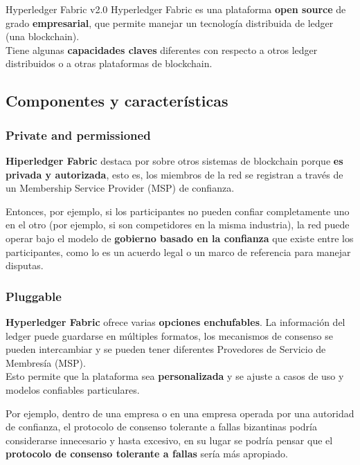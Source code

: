 \documentclass{beamer}
\begin{document}
	\begin{frame}
		\begin{block}{Hyperledger Fabric v2.0}
			Hyperledger Fabric es una plataforma \textbf{open source} de grado \textbf{empresarial}, que permite manejar un tecnología distribuida de ledger (una blockchain).\\
			\vspace{4mm}
			Tiene algunas \textbf{capacidades claves} diferentes con respecto a otros ledger distribuidos o a otras plataformas de blockchain.
		\end{block}
	\end{frame}

	\subsection{Componentes y características}
	
	\begin{frame}
		\frametitle{Private and permissioned}
		\textbf{Hiperledger Fabric} destaca por sobre otros sistemas de blockchain porque \textbf{es privada y autorizada}, esto es, los miembros de la red se registran a través de un Membership Service Provider (MSP) de confianza.\\
	\end{frame}

	\begin{frame}
		Entonces, por ejemplo, si los participantes no pueden confiar completamente uno en el otro (por ejemplo, si son competidores en la misma industria), la red puede operar bajo el modelo de \textbf{gobierno  basado en la confianza} que existe entre los participantes, como lo es un acuerdo legal o un marco de referencia para manejar disputas.
	\end{frame}
	
	\begin{frame}
		\frametitle{Pluggable}
		\textbf{Hyperledger Fabric} ofrece varias \textbf{opciones enchufables}. La información del ledger puede guardarse en múltiples formatos, los mecanismos de consenso se pueden intercambiar y se pueden tener diferentes Provedores de Servicio de Membresía (MSP).\\
		\vspace{4mm}
		Esto permite que la plataforma sea \textbf{personalizada} y se ajuste a casos de uso y modelos confiables particulares.
	\end{frame}

	\begin{frame}	
		Por ejemplo, dentro de una empresa o en una empresa operada por una autoridad de confianza, el protocolo de consenso tolerante a fallas bizantinas podría considerarse innecesario y hasta excesivo, en su lugar se podría pensar que el \textbf{protocolo de consenso tolerante a fallas} sería más apropiado.
	\end{frame}
	
\end{document}
